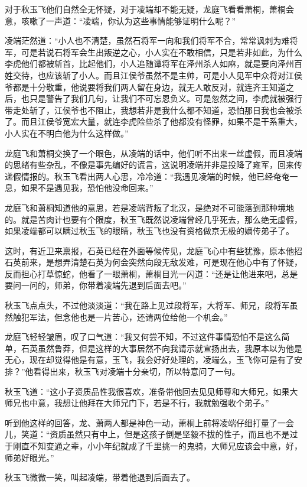 对于秋玉飞他们自然全无怀疑，对于凌端却不能无疑，龙庭飞看看萧桐，萧桐会意，咳嗽了一声道：“凌端，你认为这些事情能够证明什么呢？”

凌端茫然道：“小人也不清楚，虽然石将军一向和我们将军不合，常常讽刺为难将军，可是若说石将军会生出叛逆之心，小人实在不敢相信，只是若非如此，为什么李虎他们都被斩首，比起他们，小人追随谭将军在泽州杀人如麻，就是要向泽州百姓交待，也应该斩了小人。而且江侯爷虽然不是主帅，可是小人见军中众将对江侯爷都是十分敬重，他说要将我们两人留在身边，就无人敢反对，就连齐王知道之后，也只是警告了我们几句，让我们不可忘恩负义。可是忽然之间，李虎就被强行带走处斩了，江侯爷也不阻止，我想若非是我什么都不知道，恐怕那日我也会被杀了。而且江侯爷宽宏大量，就连李虎险些杀了他都没有怪罪，如果不是干系重大，小人实在不明白他为什么这样做。”

龙庭飞和萧桐交换了一个眼色，从凌端的话中，他们听不出来一丝虚假，而且凌端的思绪有些杂乱，不像是事先编好的谎言，这说明凌端并非是投降了雍军，回来传递假情报的。秋玉飞看出两人心思，冷冷道：“我遇见凌端的时候，他已经奄奄一息，如果不是遇见我，恐怕他没命回来。”

龙庭飞和萧桐知道他的意思，若是凌端背叛了北汉，是绝对不可能落到那种境地的。就是苦肉计也要有个限度，秋玉飞既然说凌端曾经几乎死去，那么绝无虚假，如果凌端都可以瞒过秋玉飞的眼睛，秋玉飞也没有资格做京无极的嫡传弟子了。

这时，有近卫来禀报，石英已经在外面等候传见，龙庭飞心中有些犹豫，原本他招石英前来，是想弄清楚石英为何会突然向段无敌发难，可是现在他心中有了怀疑，反而担心打草惊蛇，他看了一眼萧桐，萧桐目光一闪道：“还是让他进来吧，总是要问一问的，师弟，你带着凌端先退到后面去吧。”

秋玉飞点点头，不过他淡淡道：“我在路上见过段将军，大将军、师兄，段将军虽然触犯军法，但念他也是一片苦心，还请两位给他一个机会。”

龙庭飞轻轻皱眉，叹了口气道：“我又何尝不知，不过这件事情恐怕不是这么简单，石英虽然鲁莽，但是这样的大事居然不向我请示就宣扬出去，我原本以为他是无心，现在却觉得他是有意，玉飞，我会好好处理的，凌端么，玉飞你可是有了安排？”他看得出来，秋玉飞对凌端十分亲切，所以特意问了一句。

秋玉飞道：“这小子资质品性我很喜欢，准备带他回去见见师尊和大师兄，如果大师兄也中意，我想让他拜在大师兄门下，若是不行，我就勉强收个弟子。”

听到他这样的回答，龙、萧两人都是神色一动，萧桐上前将凌端仔细打量了一会儿，笑道：“资质虽然只有中上，但是这孩子倒是坚毅不拔的性子，而且也不是过于刚直不知变通之辈，小小年纪就成了千里挑一的鬼骑，大师兄应该会中意，好，师弟好眼光。”

秋玉飞微微一笑，叫起凌端，带着他退到后面去了。

